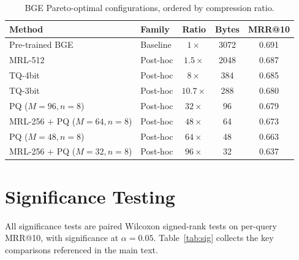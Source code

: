 \begin{table}[h]
  \centering
  \caption{BGE Pareto-optimal configurations, ordered by compression ratio.}
  \label{tab:paretobge}
  \begin{tabular}{llccc}
    \toprule
    \textbf{Method} & \textbf{Family} & \textbf{Ratio} & \textbf{Bytes} & \textbf{MRR@10} \\
    \midrule
    Pre-trained BGE                & Baseline & $1\times$    & 3072 & 0.691 \\
    MRL-512                        & Post-hoc & $1.5\times$  & 2048 & 0.687 \\
    TQ-4bit                        & Post-hoc & $8\times$    & 384  & 0.685 \\
    TQ-3bit                        & Post-hoc & $10.7\times$ & 288  & 0.680 \\
    PQ ($M{=}96, n{=}8$)           & Post-hoc & $32\times$   & 96   & 0.679 \\
    MRL-256 $+$ PQ ($M{=}64, n{=}8$) & Post-hoc & $48\times$ & 64   & 0.673 \\
    PQ ($M{=}48, n{=}8$)           & Post-hoc & $64\times$   & 48   & 0.663 \\
    MRL-256 $+$ PQ ($M{=}32, n{=}8$) & Post-hoc & $96\times$ & 32   & 0.637 \\
    \bottomrule
  \end{tabular}
\end{table}

\section{Significance Testing}
\label{app:sig}
All significance tests are paired Wilcoxon signed-rank tests on per-query MRR@10,
with significance at $\alpha=0.05$. Table~\ref{tab:sig} collects the key
comparisons referenced in the main text.

